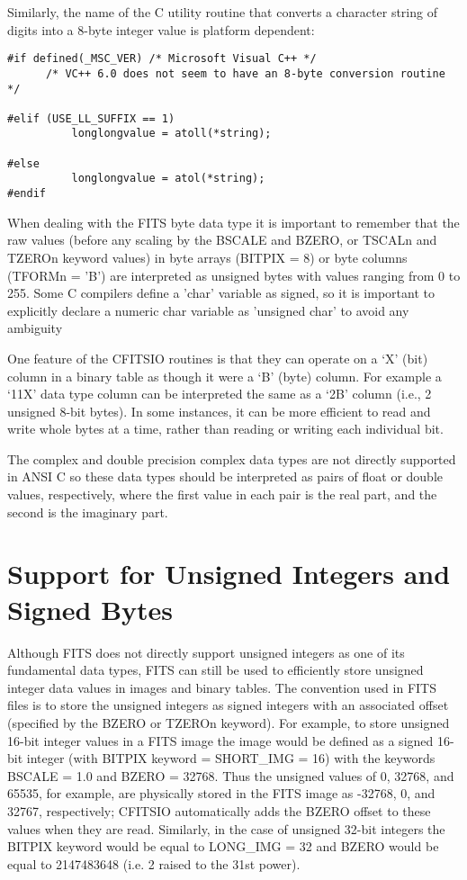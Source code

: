 \documentclass[11pt]{book}
\begin{document}
Similarly, the name of the C utility routine that converts a character
string of digits into a 8-byte integer value is platform dependent:


\begin{verbatim}
#if defined(_MSC_VER) /* Microsoft Visual C++ */
      /* VC++ 6.0 does not seem to have an 8-byte conversion routine */
	
#elif (USE_LL_SUFFIX == 1)
          longlongvalue = atoll(*string);
	
#else
          longlongvalue = atol(*string);
#endif
\end{verbatim}

When dealing with the FITS byte data type it is important to remember
that the raw values (before any scaling by the BSCALE and BZERO, or
TSCALn and TZEROn keyword values) in byte arrays (BITPIX = 8) or byte
columns (TFORMn = 'B') are interpreted as unsigned bytes with values
ranging from 0 to 255.  Some C compilers define a 'char' variable as
signed, so it is important to explicitly declare a numeric char
variable as 'unsigned char' to avoid any ambiguity

One feature of the CFITSIO routines is that they can operate on a `X'
(bit) column in a binary table as though it were a `B' (byte) column.
For example a `11X' data type column can be interpreted the same as a
`2B' column (i.e., 2 unsigned 8-bit bytes).  In some instances, it can
be more efficient to read and write whole bytes at a time, rather than
reading or writing each individual bit.

The complex and double precision complex data types are not directly
supported in ANSI C so these data types should be interpreted as pairs
of float or double values, respectively, where the first  value in each
pair is the real part, and the second is the imaginary part.


\section{Support for Unsigned Integers and Signed Bytes}

Although FITS does not directly support unsigned integers as one of its
fundamental data types, FITS can still be used to efficiently store
unsigned integer data values in images and binary tables.  The
convention used in FITS files is to store the unsigned integers as
signed integers with an associated offset (specified by the BZERO or
TZEROn keyword).  For example, to store unsigned 16-bit integer values
in a FITS image the image would be defined as a signed 16-bit integer
(with BITPIX keyword = SHORT\_IMG = 16) with the keywords BSCALE = 1.0
and BZERO = 32768.  Thus the unsigned values of 0, 32768, and 65535,
for example, are physically stored in the FITS image as -32768, 0, and
32767, respectively;  CFITSIO automatically adds the BZERO offset to
these values when they are read.  Similarly, in the case of unsigned
32-bit integers the BITPIX keyword would be equal to LONG\_IMG = 32 and
BZERO would be equal to 2147483648 (i.e. 2 raised to the 31st power).
\end{document}
